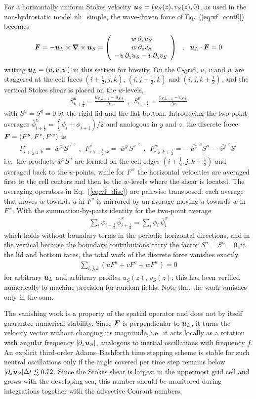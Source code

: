 \documentclass[12pt]{article}
\newcommand{\beq}  { \begin{eqnarray} }
\newcommand{\eeq}  { \end{eqnarray}}
\newcommand{\eq }  [1]{Eq.~(\ref{#1})}  %
\renewcommand{\v}[1]{{\mbox{\boldmath$ #1 $}}}  %
\newcommand{\pz}[1]{{\partial_z #1}}
\newcommand{\Bar}[1]{ \overline{ #1} }
\newcommand{\Vec}[1]{\left(\begin{array}{c} #1 \end{array}\right) }
\newcommand{\vn}{{\v \nabla}}
\newcommand{\lk}{\left(}
\newcommand{\rk}{\right)}
\begin{document}
For a horizontally uniform Stokes velocity $\v u_S = (u_S(z),v_S(z),0)$, as used in
the non-hydrostatic model nh\_simple, the wave-driven force of \eq{eq:vf_cont0} becomes
\beq
\v F =  - \v u_L \times \vn \times \v u_S =
 \Vec{ \; w \, \pz{u_S} \\  \;w \, \pz{v_S} \\ -  u \,\pz{u_S} - v\, \pz{v_S} }
 ~~,~~\v u_L \cdot\v F = 0
 \label{eq:vf_cont}
\eeq
writing $\v u_L = (u,v,w)$ in this section for brevity.
On the C-grid, $u$, $v$ and $w$ are staggered at the cell faces
$(i+\frac{1}{2},j,k)$, $(i,j+\frac{1}{2},k)$ and $(i,j,k+\frac{1}{2})$,
and the vertical Stokes shear is placed on the $w$-levels,
\beq
S^u_{k+\frac{1}{2}} = \frac{ u_{S,k+1}-u_{S,k} }{\Delta z} ~~,~~
S^v_{k+\frac{1}{2}} = \frac{ v_{S,k+1}-v_{S,k} }{\Delta z}
\eeq
with $S^u = S^v = 0$ at the rigid lid and the flat bottom.
Introducing the two-point averages
$\Bar{ \phi }^{x}_{i+\frac{1}{2}} = ( \phi_{i} + \phi_{i+1} )/2$
and analogous in $y$ and $z$, the discrete force $\v F=(F^u,F^v,F^w)$ is
\beq
F^u_{i+\frac{1}{2},j,k} = \Bar{ \; \Bar{w}^{x} \, S^u \; }^{z} ~~,~~
F^v_{i,j+\frac{1}{2},k} = \Bar{ \; \Bar{w}^{y} \, S^v \; }^{z}
~~,~~
F^w_{i,j,k+\frac{1}{2}} =
 - \Bar{ \; \Bar{u}^{x} \; }^{z} S^u  - \Bar{ \; \Bar{v}^{y} \; }^{z} S^v
\label{eq:vf_disc}
\eeq
i.e.\ the products $\Bar{w}^{x} S^u$ are formed on the cell edges
$(i+\frac{1}{2},j,k+\frac{1}{2})$ and averaged back to the $u$-points,
while for $F^w$ the horizontal velocities are averaged first to the cell
centers and then to the $w$-levels where the shear is located.
The averaging operators in \eq{eq:vf_disc} are pairwise transposed:
each average that moves $w$ towards $u$ in $F^u$ is mirrored by an average
moving $u$ towards $w$ in $F^w$. With the summation-by-parts identity for
the two-point average
\beq
\sum_i \psi_{i+\frac{1}{2}} \, \Bar{\phi}^{x}_{i+\frac{1}{2}}
= \sum_i \phi_{i} \, \Bar{\psi}^{x}_{i}
\label{eq:sbp}
\eeq
which holds without boundary terms in the periodic horizontal directions,
and in the vertical because the boundary contributions carry the factor
$S^u = S^v = 0$ at the lid and bottom faces, the total work of the discrete
force vanishes exactly,
\beq
\sum_{i,j,k} \lk u F^u + v F^v + w F^w \rk = 0
\eeq
for arbitrary $\v u_L$ and arbitrary profiles $u_S(z)$, $v_S(z)$; this has
been verified numerically to machine precision for random fields. Note that
the work vanishes only in the sum.

The vanishing work is a property of the spatial operator and does not by
itself guarantee numerical stability. Since $\v F$ is perpendicular to
$\v u_L$, it turns the velocity vector without changing its magnitude,
i.e.\ it acts locally as a rotation with angular frequency $|\pz{\v u_S}|$,
analogous to inertial oscillations with frequency $f$. An explicit
third-order Adams--Bashforth time stepping scheme is stable for such neutral
oscillations only if the angle covered per time step remains below
$|\pz{\v u_S}| \Delta t \lesssim 0.72$. Since the Stokes shear is largest in
the uppermost grid cell and grows with the developing sea, this number
should be monitored during integrations together with the advective Courant
numbers.
\end{document}
